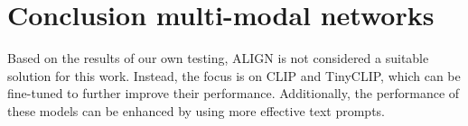 \section{Conclusion multi-modal networks}
    Based on the results of our own testing, ALIGN is not considered a suitable solution for this work. 
    Instead, the focus is on CLIP and TinyCLIP, which can be fine-tuned to further improve their performance. 
    Additionally, the performance of these models can be enhanced by using more effective text prompts.